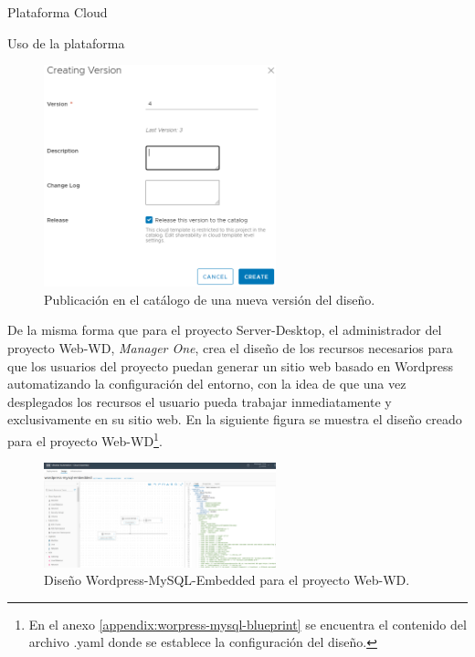 \begin{subsection}{Plataforma Cloud}
\begin{subsubsection}{Uso de la plataforma}
        \begin{figure}[h]
            \centering
            \includegraphics[width=0.6\textwidth]{imaxes/pruebaconcepto/vrealize/create-version-blueprint.png}
            \caption{Publicación en el catálogo de una nueva versión del diseño.}
            \label{fig:publication-version}
        \end{figure}
        \FloatBarrier
        De la misma forma que para el proyecto Server-Desktop, el administrador del proyecto Web-WD, \textit{Manager One}, crea el diseño de los recursos necesarios para que los usuarios del proyecto puedan generar un sitio web basado en Wordpress automatizando la configuración del entorno, con la idea de que una vez desplegados los recursos el usuario pueda trabajar inmediatamente y exclusivamente en su sitio web. En la siguiente figura se muestra el diseño creado para el proyecto Web-WD\footnote{En el anexo \ref{appendix:worpress-mysql-blueprint} se encuentra el contenido del archivo .yaml donde se establece la configuración del diseño.}.
        \begin{figure}[h]
            \centering
            \includegraphics[width=0.6\textwidth]{imaxes/pruebaconcepto/vrealize/wordpress-mysql-blueprint.png}
            \caption{Diseño Wordpress-MySQL-Embedded para el proyecto Web-WD.}
            \label{fig:web-WD-blueprint}
        \end{figure}
        \FloatBarrier

\end{subsubsection}
\end{subsection}
